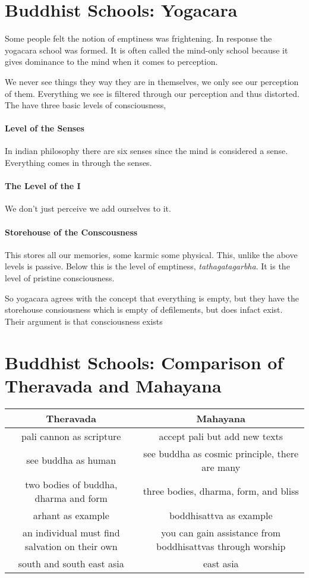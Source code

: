 \documentclass{article}
\begin{document}
\section*{Buddhist Schools: Yogacara}
\label{sec:yogacara}
Some people felt the notion of emptiness was frightening. In response the yogacara school was formed. It is often called the mind-only school because it gives dominance to the mind when it comes to perception.

We never see things they way they are in themselves, we only see our perception of them. Everything we see is filtered through our perception and thus distorted. The have three basic levels of consciousness,

\paragraph{Level of the Senses}
\label{par:level_of_the_senses}
In indian philosophy there are six senses since the mind is considered a sense. Everything comes in through the senses.

\paragraph{The Level of the I}
\label{par:the_level_of_the_i}
We don't just perceive we add ourselves to it.

\paragraph{Storehouse of the Conscousness}
\label{par:storehouse_of_the_conscousness}
This stores all our memories, some karmic some physical. This, unlike the above levels is passive. Below this is the level of emptiness, \emph{tathagatagarbha}. It is the level of pristine consciousness.

So yogacara agrees with the concept that everything is empty, but they have the storehouse consiousness which is empty of defilements, but does infact exist. Their argument is that consciousness exists

\section*{Buddhist Schools: Comparison of Theravada and Mahayana}
\label{sec:comparison_of_theravada_and_mahayana}

\begin{tabular}{c|c}
\textbf{Theravada} & \textbf{Mahayana}\\
\hline
pali cannon as scripture & accept pali but add new texts\\
\hline
see buddha as human & see buddha as cosmic principle, there are many\\
\hline
two bodies of buddha, dharma and form & three bodies, dharma, form, and bliss\\
\hline
arhant as example & boddhisattva as example\\
\hline
an individual must find salvation on their own & you can gain assistance from boddhisattvas through worship\\
\hline
south and south east asia & east asia\\
\end{tabular}
\end{document}
